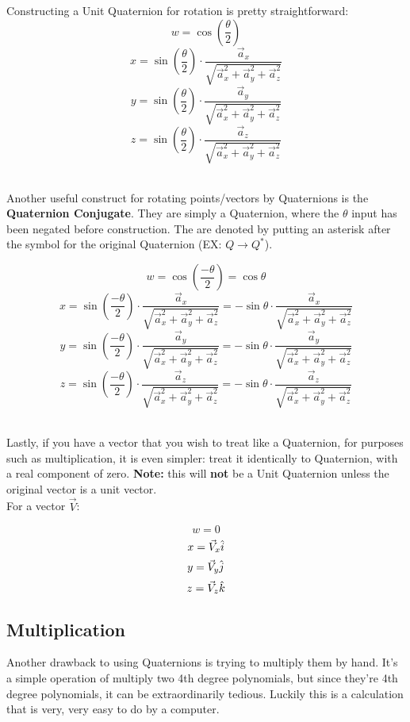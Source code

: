 \begin{minipage}{\textwidth}
Constructing a Unit Quaternion for rotation is pretty straightforward:
\\
$$w=\cos{\left(\frac{\theta}{2}\right)}$$
$$x=\sin{\left(\frac{\theta}{2}\right)}\cdot\frac{\vec{a}_x}{\sqrt{\vec{a}_x^2+\vec{a}_y^2+\vec{a}_z^2}}$$ 
$$y=\sin{\left(\frac{\theta}{2}\right)}\cdot\frac{\vec{a}_y}{\sqrt{\vec{a}_x^2+\vec{a}_y^2+\vec{a}_z^2}}$$ 
$$z=\sin{\left(\frac{\theta}{2}\right)}\cdot\frac{\vec{a}_z}{\sqrt{\vec{a}_x^2+\vec{a}_y^2+\vec{a}_z^2}}$$\\
\end{minipage}
\indent Another useful construct for rotating points/vectors by Quaternions is the \textbf{Quaternion Conjugate}. They are simply a Quaternion, where the $\theta$ input has been negated before construction. The are denoted by putting an asterisk after the symbol for the original Quaternion (EX: $Q \rightarrow Q^*$).
\\[7.5pt]
\begin{minipage}{\textwidth}
$$w=\cos\left(\frac{-\theta}{2}\right)=\cos{\theta}$$
$$x=\sin\left(\frac{-\theta}{2}\right)\cdot\frac{\vec{a}_x}{\sqrt{\vec{a}_x^2+\vec{a}_y^2+\vec{a}_z^2}}=-\sin{\theta}\cdot\frac{\vec{a}_x}{\sqrt{\vec{a}_x^2+\vec{a}_y^2+\vec{a}_z^2}}$$ 
$$y=\sin\left(\frac{-\theta}{2}\right)\cdot\frac{\vec{a}_y}{\sqrt{\vec{a}_x^2+\vec{a}_y^2+\vec{a}_z^2}}=-\sin{\theta}\cdot\frac{\vec{a}_y}{\sqrt{\vec{a}_x^2+\vec{a}_y^2+\vec{a}_z^2}}$$ 
$$z=\sin\left(\frac{-\theta}{2}\right)\cdot\frac{\vec{a}_z}{\sqrt{\vec{a}_x^2+\vec{a}_y^2+\vec{a}_z^2}}=-\sin{\theta}\cdot\frac{\vec{a}_z}{\sqrt{\vec{a}_x^2+\vec{a}_y^2+\vec{a}_z^2}}$$ \\
\end{minipage}

Lastly, if you have a vector that you wish to treat like a Quaternion, for purposes such as multiplication, it is even simpler: treat it identically to Quaternion, with a real component of zero. \textbf{Note:} this will \textbf{not} be a Unit Quaternion unless the original vector is a unit vector. 
\\[10pt]
For a vector $\vec{V}$:

$$w=0$$
$$x=\vec{V}_x\hat{\textcolor{black}{i}}$$
$$y=\vec{V}_y\hat{\textcolor{black}{j}}$$
$$z=\vec{V}_z\hat{\textcolor{black}{k}}$$
\newpage
\subsection{Multiplication}
Another drawback to using Quaternions is trying to multiply them by hand. It's a simple operation of multiply two 4th degree polynomials, but since they're 4th degree polynomials, it can be extraordinarily tedious. Luckily this is a calculation that is very, very easy to do by a computer. 

